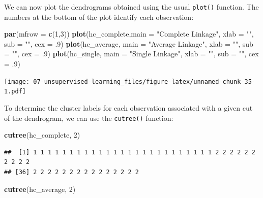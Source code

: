 \documentclass[openany]{book}
\newenvironment{Shaded}{\begin{snugshade}}{\end{snugshade}}
\newcommand{\DataTypeTok}[1]{\textcolor[rgb]{0.13,0.29,0.53}{#1}}
\newcommand{\DecValTok}[1]{\textcolor[rgb]{0.00,0.00,0.81}{#1}}
\newcommand{\FloatTok}[1]{\textcolor[rgb]{0.00,0.00,0.81}{#1}}
\newcommand{\KeywordTok}[1]{\textcolor[rgb]{0.13,0.29,0.53}{\textbf{#1}}}
\newcommand{\NormalTok}[1]{#1}
\newcommand{\StringTok}[1]{\textcolor[rgb]{0.31,0.60,0.02}{#1}}
\begin{document}
We can now plot the dendrograms obtained using the usual \texttt{plot()} function.
The numbers at the bottom of the plot identify each observation:

\begin{Shaded}
\begin{Highlighting}[]
\KeywordTok{par}\NormalTok{(}\DataTypeTok{mfrow =} \KeywordTok{c}\NormalTok{(}\DecValTok{1}\NormalTok{,}\DecValTok{3}\NormalTok{))}
\KeywordTok{plot}\NormalTok{(hc_complete,}\DataTypeTok{main =} \StringTok{"Complete Linkage"}\NormalTok{, }\DataTypeTok{xlab =} \StringTok{""}\NormalTok{, }\DataTypeTok{sub =} \StringTok{""}\NormalTok{, }\DataTypeTok{cex =} \FloatTok{.9}\NormalTok{)}
\KeywordTok{plot}\NormalTok{(hc_average, }\DataTypeTok{main =} \StringTok{"Average Linkage"}\NormalTok{, }\DataTypeTok{xlab =} \StringTok{""}\NormalTok{, }\DataTypeTok{sub =} \StringTok{""}\NormalTok{, }\DataTypeTok{cex =} \FloatTok{.9}\NormalTok{)}
\KeywordTok{plot}\NormalTok{(hc_single, }\DataTypeTok{main =} \StringTok{"Single Linkage"}\NormalTok{, }\DataTypeTok{xlab =} \StringTok{""}\NormalTok{, }\DataTypeTok{sub =} \StringTok{""}\NormalTok{, }\DataTypeTok{cex =} \FloatTok{.9}\NormalTok{)}
\end{Highlighting}
\end{Shaded}

\texttt{[image: 07-unsupervised-learning\_files/figure-latex/unnamed-chunk-35-1.pdf]}

To determine the cluster labels for each observation associated with a
given cut of the dendrogram, we can use the \texttt{cutree()} function:

\begin{Shaded}
\begin{Highlighting}[]
\KeywordTok{cutree}\NormalTok{(hc_complete, }\DecValTok{2}\NormalTok{)}
\end{Highlighting}
\end{Shaded}

\begin{verbatim}
##  [1] 1 1 1 1 1 1 1 1 1 1 1 1 1 1 1 1 1 1 1 1 1 1 1 1 1 2 2 2 2 2 2 2 2 2 2
## [36] 2 2 2 2 2 2 2 2 2 2 2 2 2 2 2
\end{verbatim}

\begin{Shaded}
\begin{Highlighting}[]
\KeywordTok{cutree}\NormalTok{(hc_average, }\DecValTok{2}\NormalTok{)}
\end{Highlighting}
\end{Shaded}
\end{document}
